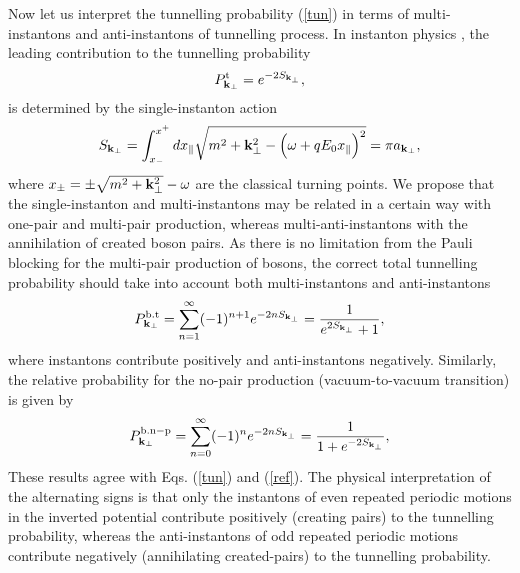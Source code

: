 \documentclass[a4paper,prd,showpacs,preprintnumbers,amsmath,amssymb]{revtex4}
\begin{document}
Now let us interpret the tunnelling probability (\ref{tun}) in
terms of multi-instantons and anti-instantons of tunnelling
process. In instanton physics \cite{col}, the leading contribution
to the tunnelling probability
\begin{equation}
P^{\rm t}_{{\bf k}_{\perp}} = e^{- 2 S_{{\bf k}_{\perp}}},
\end{equation}
is determined by the single-instanton action
\begin{equation}
S_{{\bf k}_{\perp}} = \int_{x_-}^{x^+} dx_{\parallel} \sqrt{m^2 +
{\bf k}_{\perp}^2 - \Bigl( \omega + qE_0 x_{\parallel} \Bigr)^2 }
= \pi  a_{{\bf k}_{\perp}}, \label{inst}
\end{equation}
where $x_{\pm} = \pm \sqrt{m^2 + {\bf k}_{\perp}^2} - \omega$ are
the classical turning points. We propose that the single-instanton
and multi-instantons may be related in a certain way with one-pair
and multi-pair production, whereas multi-anti-instantons with the
annihilation of created boson pairs. As there is no limitation
from the Pauli blocking for the multi-pair production of bosons,
the correct total tunnelling probability should take into account
both multi-instantons and anti-instantons
\begin{equation}
P^{\rm b.t}_{{\bf k}_{\perp}} = \sum_{n = 1}^{\infty} (-1)^{n+1}
e^{- 2n S_{{\bf k}_{\perp}}} = \frac{1}{ e^{2S_{{\bf k}_{\perp}}}
+ 1},
\end{equation}
where instantons contribute positively and anti-instantons
negatively. Similarly, the relative probability for the no-pair
production (vacuum-to-vacuum transition) is given by
\begin{equation}
P^{\rm b.n-p}_{{\bf k}_{\perp}} =  \sum_{n = 0}^{\infty} (-1)^{n}
e^{- 2n S_{{\bf k}_{\perp}}} = \frac{1}{1 + e^{- 2S_{{\bf
k}_{\perp}}}},
\end{equation}
These results agree with Eqs. (\ref{tun}) and (\ref{ref}). The
physical interpretation of the alternating signs is that only the
instantons of even repeated periodic motions in the inverted
potential contribute positively (creating pairs) to the tunnelling
probability, whereas the anti-instantons of odd repeated periodic
motions contribute negatively (annihilating created-pairs) to the
tunnelling probability.
\end{document}

